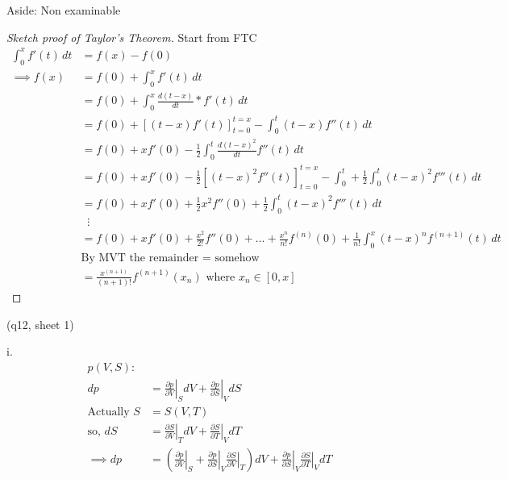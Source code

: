 \begin{aside}{Aside: Non examinable}
    \begin{proof}[Sketch proof of Taylor's Theorem]
        Start from FTC
        \begin{align*}
            \int_{0}^{x} f'(t) \,dt &= f(x) - f(0) \\
            \implies f(x) &= f(0) + \int_{0}^{x} f'(t) \,dt \\
            &= f(0) + \int_{0}^{x} \frac{d (t - x)}{d t} * f'(t) \,dt \\
            &= f(0) + [ (t - x) f'(t)]^{t = x}_{t = 0} - \int_{0}^{t} (t - x) f''(t) \,dt \\
            &= f(0) + xf'(0) - \frac{1}{2} \int_{0}^{t} \frac{d (t-x)^2}{d t} f''(t) \,dt \\
            &= f(0) + xf'(0) - \frac{1}{2} [(t-x)^2 f''(t)]^{t = x}_{t = 0} - \int_{0}^{t} + \frac{1}{2} \int_{0}^{t} (t - x)^2 f'''(t) \,dt \\
            &= f(0) + xf'(0) + \frac{1}{2} x^2 f''(0) + \frac{1}{2} \int_{0}^{t} (t - x)^2 f'''(t) \,dt \\
            &\;\;\vdots \\
            &= f(0) + xf'(0) + \frac{x^2}{2!} f''(0) + \dots + \frac{x^n}{n!} f^{(n)}(0) + \frac{1}{n!} \int_{0}^{x} (t - x)^n f^{(n + 1)}(t) \,dt \\
            &\text{By MVT the remainder = somehow} \\
            &= \frac{x^{(n+1)}}{(n + 1)!} f^{(n + 1)}(x_n) \text{ where } x_n \in [0, x]
        \end{align*}
        \end{proof}
\end{aside}

(q12, sheet 1)

i. 
\begin{align*}
    p(V, S): \\
    dp &= \left. \frac{\partial p}{\partial V} \right|_S dV + \left. \frac{\partial p}{\partial S} \right|_V dS \\
    \text{Actually } S &= S(V, T) \\
    \text{so, } dS &= \left. \frac{\partial S}{\partial V} \right|_{T} dV + \left. \frac{\partial S}{\partial T} \right|_{V} dT \\
    \implies dp &= \left( \left. \frac{\partial p}{\partial V} \right|_{S} + \left. \frac{\partial p}{\partial S} \right|_{V} \left. \frac{\partial S}{\partial V} \right|_{T} \right) dV + \left. \frac{\partial p}{\partial S} \right|_{V} \left. \frac{\partial S}{\partial T} \right|_{V} dT
\end{align*} 

